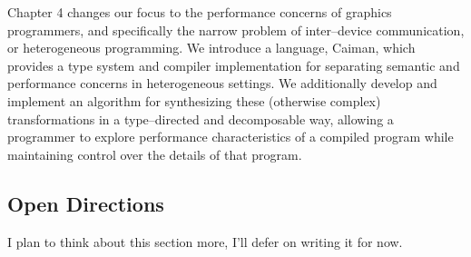 Chapter 4 changes our focus to the performance concerns of graphics programmers, and specifically the narrow problem of inter--device communication, or heterogeneous programming.  We introduce a language, Caiman, which provides a type system and compiler implementation for separating semantic and performance concerns in heterogeneous settings.  We additionally develop and implement an algorithm for synthesizing these (otherwise complex) transformations in a type--directed and decomposable way, allowing a programmer to explore performance characteristics of a compiled program while maintaining control over the details of that program.

\subsection{Open Directions}
\label{subsec:problems}

I plan to think about this section more, I'll defer on writing it for now.